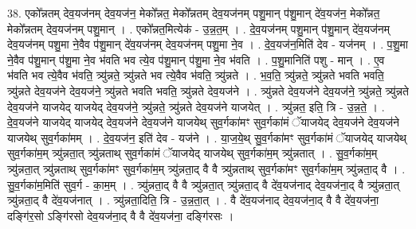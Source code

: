 \documentclass[17pt]{extarticle}
\begin{document}
38. एको᳚न्नतम् देव॒यज॑नम् देव॒यज॑न॒ मेको᳚न्नत॒ मेको᳚न्नतम् देव॒यज॑नम् पशु॒मान् प॑शु॒मान् दे॑व॒यज॑न॒ मेको᳚न्नत॒ मेको᳚न्नतम् देव॒यज॑नम् पशु॒मान् । . एको᳚न्नत॒मित्येक॑ - उ॒न्न॒त॒म् । . दे॒व॒यज॑नम् पशु॒मान् प॑शु॒मान् दे॑व॒यज॑नम् देव॒यज॑नम् पशु॒मा ने॒वैव प॑शु॒मान् दे॑व॒यज॑नम् देव॒यज॑नम् पशु॒मा ने॒व । . दे॒व॒यज॑न॒मिति॑ देव - यज॑नम् । . प॒शु॒मा ने॒वैव प॑शु॒मान् प॑शु॒मा ने॒व भ॑वति भव त्ये॒व प॑शु॒मान् प॑शु॒मा ने॒व भ॑वति । . प॒शु॒मानिति॑ पशु - मान् । . ए॒व भ॑वति भव त्ये॒वैव भ॑वति॒ त्र्यु॑न्नते॒ त्र्यु॑न्नते भव त्ये॒वैव भ॑वति॒ त्र्यु॑न्नते । . भ॒व॒ति॒ त्र्यु॑न्नते॒ त्र्यु॑न्नते भवति भवति॒ त्र्यु॑न्नते देव॒यज॑ने देव॒यज॑ने॒ त्र्यु॑न्नते भवति भवति॒ त्र्यु॑न्नते देव॒यज॑ने । . त्र्यु॑न्नते देव॒यज॑ने देव॒यज॑ने॒ त्र्यु॑न्नते॒ त्र्यु॑न्नते देव॒यज॑ने याजयेद् याजयेद् देव॒यज॑ने॒ त्र्यु॑न्नते॒ त्र्यु॑न्नते देव॒यज॑ने याजयेत् । . त्र्यु॑न्नत॒ इति॒ त्रि - उ॒न्न॒ते॒ । . दे॒व॒यज॑ने याजयेद् याजयेद् देव॒यज॑ने देव॒यज॑ने याजयेथ् सुव॒र्गका॑मꣳ सुव॒र्गका॑मं ॅयाजयेद् देव॒यज॑ने देव॒यज॑ने याजयेथ् सुव॒र्गका॑मम् । . दे॒व॒यज॑न॒ इति॑ देव - यज॑ने । . या॒ज॒ये॒थ् सु॒व॒र्गका॑मꣳ सुव॒र्गका॑मं ॅयाजयेद् याजयेथ् सुव॒र्गका॑म॒म् त्र्यु॑न्नता॒त् त्र्यु॑न्नताथ् सुव॒र्गका॑मं ॅयाजयेद् याजयेथ् सुव॒र्गका॑म॒म् त्र्यु॑न्नतात् । . सु॒व॒र्गका॑म॒म् त्र्यु॑न्नता॒त् त्र्यु॑न्नताथ् सुव॒र्गका॑मꣳ सुव॒र्गका॑म॒म् त्र्यु॑न्नता॒द् वै वै त्र्यु॑न्नताथ् सुव॒र्गका॑मꣳ सुव॒र्गका॑म॒म् त्र्यु॑न्नता॒द् वै । . सु॒व॒र्गका॑म॒मिति॑ सुव॒र्ग - का॒म॒म् । . त्र्यु॑न्नता॒द् वै वै त्र्यु॑न्नता॒त् त्र्यु॑न्नता॒द् वै दे॑व॒यज॑नाद् देव॒यज॑ना॒द् वै त्र्यु॑न्नता॒त् त्र्यु॑न्नता॒द् वै दे॑व॒यज॑नात् । . त्र्यु॑न्नता॒दिति॒ त्रि - उ॒न्न॒ता॒त् । . वै दे॑व॒यज॑नाद् देव॒यज॑ना॒द् वै वै दे॑व॒यज॑ना॒ दङ्गि॑र॒सो ऽङ्गि॑रसो देव॒यज॑ना॒द् वै वै दे॑व॒यज॑ना॒ दङ्गि॑रसः । \newline
\end{document}
